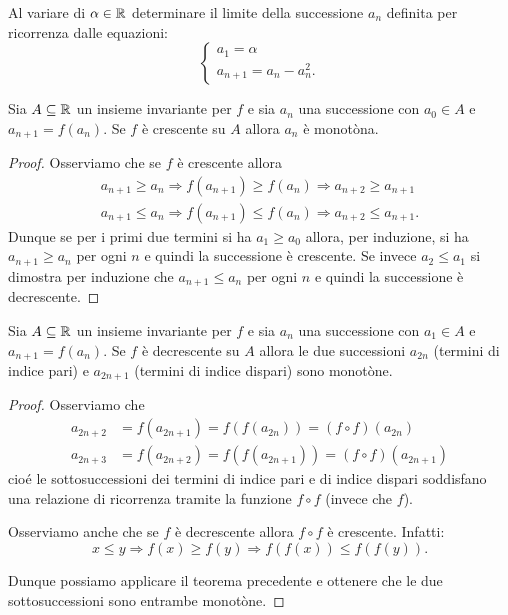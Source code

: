 \begin{exercise}
Al variare di $\alpha \in {\mathbb R}$
determinare il limite della successione $a_n$ definita per ricorrenza dalle
equazioni:
\[
\begin{cases}
 a_1 = \alpha \\
 a_{n+1} = a_n - a_n^2.
\end{cases}
\]
\end{exercise}

\begin{theorem}
\mymark{**}%
  Sia $A\subseteq {\mathbb R}$ un insieme invariante per $f$ e sia $a_n$ una successione
  con $a_0\in A$ e $a_{n+1} = f(a_n)$. Se $f$ è crescente
  su $A$ allora $a_n$
  è monotòna.
\end{theorem}
\begin{proof}
\mymark{**}%
  Osserviamo che se $f$ è crescente allora
  \begin{align*}
    a_{n+1} \ge a_n \Rightarrow f(a_{n+1}) \ge f(a_n) \Rightarrow
    a_{n+2} \ge a_{n+1}\\
    a_{n+1} \le a_n \Rightarrow f(a_{n+1}) \le f(a_n) \Rightarrow a_{n+2} \le a_{n+1}.
  \end{align*}
  Dunque se per i primi due termini si ha $a_1 \ge a_0$ allora, per
  induzione, si ha $a_{n+1} \ge a_n$ per ogni $n$ e quindi la
  successione è crescente. Se invece $a_2 \le a_1$ si dimostra per
  induzione che $a_{n+1} \le a_n$ per ogni $n$ e quindi la successione
  è decrescente.
\end{proof}

\begin{theorem}\label{th_decr}%
\mymark{**}%
  Sia $A\subseteq {\mathbb R}$ un insieme invariante per $f$ e sia $a_n$ una successione
  con $a_1\in A$ e $a_{n+1} = f(a_n)$. Se $f$ è decrescente
  su $A$
  allora le due successioni $a_{2n}$ (termini di indice pari) e
  $a_{2n+1}$ (termini di indice dispari) sono monotòne.
\end{theorem}
\begin{proof}
\mymark{**}%
  Osserviamo che
  \begin{align*}
    a_{2n+2} &= f(a_{2n+1}) = f(f(a_{2n})) = (f\circ f)(a_{2n})\\
    a_{2n+3} &= f(a_{2n+2}) = f(f(a_{2n+1})) = (f\circ f)(a_{2n+1})
  \end{align*}
cioé le sottosuccessioni dei termini di indice pari e di indice
dispari soddisfano una relazione di ricorrenza tramite la funzione
$f\circ f$ (invece che $f$).

Osserviamo anche che se $f$ è decrescente allora $f\circ f$ è
crescente. Infatti:
\[
x \le y \Rightarrow f(x) \ge f(y) \Rightarrow f(f(x)) \le f(f(y)).
\]

Dunque possiamo applicare il teorema precedente e ottenere che le due
sottosuccessioni sono entrambe monotòne.
\end{proof}

